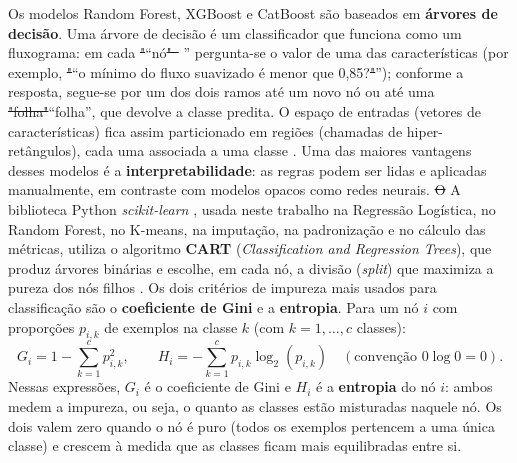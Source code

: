 \documentclass[msc]{on} %
\makeatletter
\providecommand{\DIFaddtex}[1]{{\protect\color{red}#1}} %
\providecommand{\DIFdeltex}[1]{{\protect\color{red}\sout{#1}}} %
\providecommand{\DIFaddbegin}{} %
\providecommand{\DIFaddend}{} %
\providecommand{\DIFdelbegin}{} %
\providecommand{\DIFdelend}{} %
\providecommand{\DIFadd}[1]{\texorpdfstring{\DIFaddtex{#1}}{#1}} %
\providecommand{\DIFdel}[1]{\texorpdfstring{\DIFdeltex{#1}}{}} %
\let\sout@orig\sout %
\renewcommand{\sout}[1]{\ifmmode\text{\sout@orig{\ensuremath{#1}}}\else\sout@orig{#1}\fi} %
\makeatother
\begin{document}
Os modelos Random Forest, XGBoost e CatBoost são baseados em \textbf{árvores de decisão}. Uma árvore de decisão é um classificador que funciona como um fluxograma: em cada \DIFdelbegin \DIFdel{"}\DIFdelend\ifhmode\hskip0pt\fi \DIFaddbegin \DIFadd{``}\DIFaddend nó\DIFdelbegin \DIFdel{"~ }\DIFdelend\ifhmode\hskip0pt\fi \DIFaddbegin \DIFadd{'' }\DIFaddend pergunta-se o valor de uma das características (por exemplo, \DIFdelbegin \DIFdel{"}\DIFdelend\ifhmode\hskip0pt\fi \DIFaddbegin \DIFadd{``}\DIFaddend o mínimo do fluxo suavizado é menor que 0,85?\DIFdelbegin \DIFdel{"}\DIFdelend\ifhmode\hskip0pt\fi \DIFaddbegin \DIFadd{''}\DIFaddend ); conforme a resposta, segue-se por um dos dois ramos até um novo nó ou até uma \DIFdelbegin \DIFdel{"folha"}\DIFdelend\ifhmode\hskip0pt\fi \DIFaddbegin \DIFadd{``folha''}\DIFaddend , que devolve a classe predita. O espaço de entradas (vetores de características) fica assim particionado em regiões (\DIFaddbegin \DIFadd{chamadas de }\DIFaddend hiper-retângulos), cada uma associada a uma classe \citep{Levada2026}. Uma das maiores vantagens \DIFaddbegin \DIFadd{desses modelos }\DIFaddend é a \textbf{interpretabilidade}: as regras podem ser lidas e aplicadas manualmente, em contraste com modelos opacos como redes neurais. \DIFdelbegin \DIFdel{O }\DIFdelend\ifhmode\hskip0pt\fi \DIFaddbegin \DIFadd{A biblioteca Python }\DIFaddend \textit{scikit-learn} \citep{ScikitLearn2011}\DIFaddbegin \DIFadd{, usada neste trabalho na Regressão Logística, no Random Forest, no K-means, na imputação, na padronização e no cálculo das métricas, }\DIFaddend utiliza o algoritmo \textbf{CART} (\textit{Classification and Regression Trees}), que produz árvores binárias e escolhe, em cada nó, a divisão \DIFaddbegin \DIFadd{(}\textit{\DIFadd{split}}\DIFadd{) }\DIFaddend que maximiza a pureza dos nós filhos \citep{geron2019maos}. Os dois critérios de impureza mais usados para classificação são o \textbf{coeficiente de Gini} e a \textbf{entropia}. Para um nó \(i\) com proporções \(p_{i,k}\) de exemplos na classe \(k\) (com \(k=1,\ldots,c\) classes):
\begin{equation}
G_i = 1 - \sum_{k=1}^{c} p_{i,k}^2, \qquad
H_i = -\sum_{k=1}^{c} p_{i,k} \log_2(p_{i,k}) \quad (\text{convenção } 0\log 0 = 0).
\end{equation}
Nessas expressões, \(G_i\) é o coeficiente de Gini e \(H_i\) é a \textbf{entropia} do nó \(i\): ambos medem a impureza, ou seja, o quanto as classes estão misturadas naquele nó. Os dois valem zero quando o nó é puro (todos os exemplos pertencem a uma única classe) e crescem à medida que as classes ficam mais equilibradas entre si.
\end{document}
